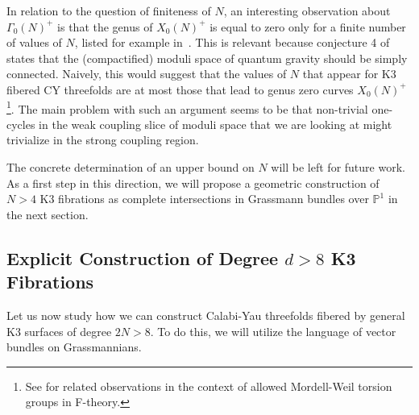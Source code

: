 \documentclass[11pt,a4paper]{article}
\numberwithin{equation}{section}
\numberwithin{table}{section}\setlength{\multlinegap}{25pt}
\begin{document}
In relation to the question of finiteness of $N$, an interesting observation about $\Gamma_0(N)^+$ is that the genus of $X_0(N)^+$ is equal to zero only for a finite number of values of $N$, listed for example in~\cite{BayerTravesa:2007}. This is relevant because conjecture 4 of~\cite{Ooguri:2006in} states that the (compactified) moduli space of quantum gravity should be simply connected. Naively, this would suggest that the values of $N$ that appear for K3 fibered CY threefolds are at most those that lead to genus zero curves $X_0(N)^+$\footnote{See \cite{Hajouji:2019vxs,Dierigl:2020lai} for related observations in the context of allowed Mordell-Weil torsion groups in F-theory.}. The main problem with such an argument seems to be that non-trivial one-cycles in the weak coupling slice of moduli space that we are looking at might trivialize in the strong coupling region.

The concrete determination of an upper bound on $N$ will be left for future work. As a first step in this direction, we will propose a geometric construction of $N>4$ K3 fibrations as complete intersections in Grassmann bundles over $\mathbb{P}^1$ in the next section.

\subsection{Explicit Construction of Degree \texorpdfstring{$d>8$}{d>8} K3 Fibrations}
\label{subsec:Grassmannian Constructions}

Let us now study how we can construct Calabi-Yau threefolds fibered by general K3 surfaces of degree $2N>8$. To do this, we will utilize the language of vector bundles on Grassmannians.
\end{document}
